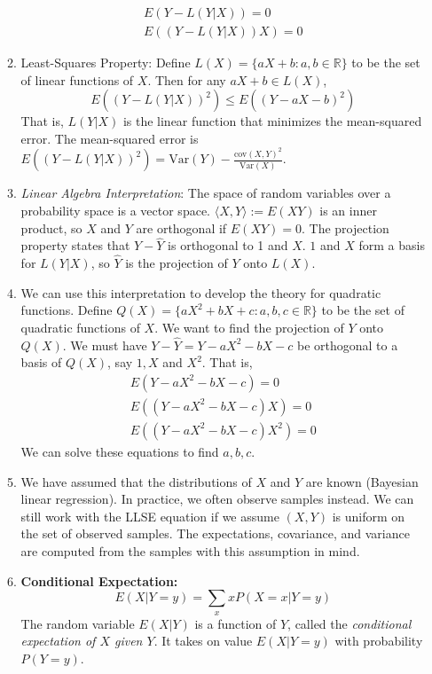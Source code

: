 \documentclass[10pt]{article}
\begin{document}
\begin{multicols}{2}
\begin{enumerate}
\begin{enumerate}
            \begin{align*}
                E\left(Y-L(Y|X)\right) = 0 \\
                E\left((Y-L(Y|X))X\right) = 0
            \end{align*}
            \item Least-Squares Property: Define $L(X)=\{ aX+b:a,b \in \mathbb{R}\}$ to be the set of linear functions of $X$. Then for any $aX+b \in L(X)$,
            $$E\left((Y-L(Y|X))^2\right) \leq E\left((Y-aX-b)^2\right)$$
            That is, $L(Y|X)$ is the linear function that minimizes the mean-squared error. The mean-squared error is $E\left((Y-L(Y|X))^2\right)=\text{Var}(Y)-\frac{\text{cov}(X,Y)^2}{\text{Var}(X)}$.
            \item \textit{Linear Algebra Interpretation}: The space of random variables over a probability space is a vector space. $\langle X,Y \rangle:= E(XY)$ is an inner product, so $X$ and $Y$ are orthogonal if $E(XY)=0$. The projection property states that $Y-\hat{Y}$ is orthogonal to 1 and $X$. $1$ and $X$ form a basis for $L(Y|X)$, so $\hat{Y}$ is the projection of $Y$ onto $L(X)$. 
            \item We can use this interpretation to develop the theory for quadratic functions. Define $Q(X)=\{ aX^2+bX+c:a,b,c \in \mathbb{R}\}$ to be the set of quadratic functions of $X$. We want to find the projection of $Y$ onto $Q(X)$. We must have $Y-\hat{Y}=Y-aX^2-bX-c$ be orthogonal to a basis of $Q(X)$, say $1,X$ and $X^2$. That is,
            \begin{align*}
                E(Y-aX^2-bX-c) = 0 \\
                E((Y-aX^2-bX-c)X) = 0 \\
                E((Y-aX^2-bX-c)X^2) = 0 
            \end{align*}
            We can solve these equations to find $a,b,c$.
            \item We have assumed that the distributions of $X$ and $Y$ are known (Bayesian linear regression). In practice, we often observe samples instead. We can still work with the LLSE equation if we assume $(X,Y)$ is uniform on the set of observed samples. The expectations, covariance, and variance are computed from the samples with this assumption in mind. 
            \item \textbf{Conditional Expectation:} $$E(X|Y=y) = \sum_{x} xP(X=x|Y=y)$$
            The random variable $E(X|Y)$ is a function of $Y$, called the \textit{conditional expectation of $X$ given $Y$}. It takes on value $E(X|Y=y)$ with probability $P(Y=y)$. \\ 

\end{enumerate}
\end{enumerate}
\end{multicols}
\end{document}
